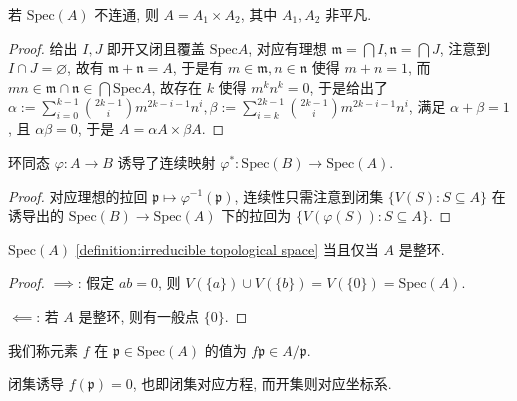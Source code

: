 \begin{lemma}
    若 \(\mathrm{Spec} (A)\) 不连通, 则 \(A = A_1 \times A_2\), 其中 \(A_1,A_2\) 非平凡.

    \begin{proof}
        给出 \(I,J\) 即开又闭且覆盖 \(\mathrm{Spec} A\), 对应有理想 \(\mathfrak{m} = \bigcap I, \mathfrak{n} = \bigcap J\),
        注意到 \(I \cap J = \varnothing\), 故有 \(\mathfrak{m} + \mathfrak{n} = A\), 于是有 \(m \in \mathfrak{m}, n \in \mathfrak{n}\) 使得 \(m + n = 1\),
        而 \(mn \in \mathfrak{m} \cap \mathfrak{n} \in \bigcap \mathrm{Spec} A\), 故存在 \(k\) 使得 \(m^k n^k = 0\), 于是给出了 \(\alpha := \sum_{i=0}^{k-1} \binom{2k-1}{i} m^{2k-i-1} n^{i}, \beta := \sum_{i=k}^{2k-1} \binom{2k-1}{i} m^{2k-i-1} n^{i}\),
        满足 \(\alpha + \beta = 1\), 且 \(\alpha \beta = 0\), 于是 \(A = \alpha A \times \beta A\).
    \end{proof}
\end{lemma}

\begin{lemma}
    环同态 \(\varphi : A \to B\) 诱导了连续映射 \(\varphi^\ast : \mathrm{Spec} (B) \to \mathrm{Spec} (A)\).

    \begin{proof}
        对应理想的拉回 \(\mathfrak{p} \mapsto \varphi^{-1}(\mathfrak{p})\), 连续性只需注意到闭集 \(\{V(S) : S \subseteq A\}\) 在诱导出的 \(\mathrm{Spec} (B) \to \mathrm{Spec} (A)\) 下的拉回为 \(\{V(\varphi(S)) : S \subseteq A\}\).
    \end{proof}
\end{lemma}

\begin{lemma}
    \label {lemma:irreducible iff domain}
    \(\mathrm{Spec} (A)\) \ref{definition:irreducible topological space} 当且仅当 \(A\) 是整环.

    \begin{proof}
        \(\implies\): 假定 \(ab = 0\), 则 \(V(\{a\}) \cup V(\{b\}) = V(\{0\}) = \mathrm{Spec} (A)\).

        \(\impliedby\): 若 \(A\) 是整环, 则有一般点 \(\{0\}\).
    \end{proof}
\end{lemma}

\begin{remark}
    我们称元素 \(f\) 在 \(\mathfrak{p} \in \mathrm{Spec} (A)\) 的值为 \(f \mathfrak{p} \in A / \mathfrak{p}\).
\end{remark}

\begin{remark}
    闭集诱导 \(f(\mathfrak{p}) = 0\), 也即闭集对应方程, 而开集则对应坐标系.
\end{remark}

